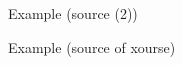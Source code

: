 \begin{frame}{Example (source (2))}
  
  \begin{center}
  
  \end{center}
  
\end{frame}

\begin{frame}{Example (source of xourse)}
  
  \begin{center}
  
  \end{center}
  
\end{frame}


